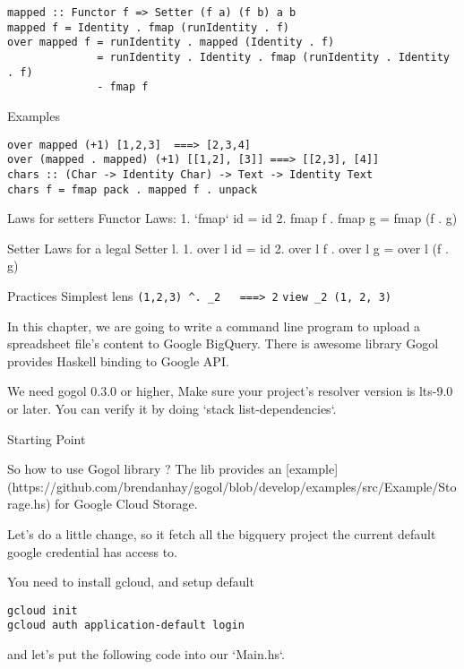 \begin{verbatim}
mapped :: Functor f => Setter (f a) (f b) a b
mapped f = Identity . fmap (runIdentity . f)
over mapped f = runIdentity . mapped (Identity . f)
              = runIdentity . Identity . fmap (runIdentity . Identity . f)
              - fmap f
\end{verbatim}

Examples

\begin{verbatim}
over mapped (+1) [1,2,3]  ===> [2,3,4]
over (mapped . mapped) (+1) [[1,2], [3]] ===> [[2,3], [4]]
chars :: (Char -> Identity Char) -> Text -> Identity Text
chars f = fmap pack . mapped f . unpack
\end{verbatim}

Laws for setters
Functor Laws:
1. `fmap` id = id
2. fmap f . fmap g = fmap (f . g)

Setter Laws for a legal Setter l.
1. over l id = id
2. over l f . over l g = over l (f . g)


Practices
Simplest lens
\verb|(1,2,3) ^. _2   ===> 2|
\verb|view _2 (1, 2, 3)|



In this chapter, we are going to write a command line program to upload a spreadsheet file's content to Google BigQuery. There is awesome library Gogol provides Haskell binding to Google API.



We need gogol 0.3.0 or higher, Make sure your project's resolver version is lts-9.0 or later. You can verify it by doing `stack list-dependencies`.

Starting Point

So how to use Gogol library ? The lib provides an [example](https://github.com/brendanhay/gogol/blob/develop/examples/src/Example/Storage.hs) for Google Cloud Storage.

Let's do a little change, so it fetch all the bigquery project the current default google credential has access to.

You need to install gcloud, and setup default
\begin{verbatim}
gcloud init
gcloud auth application-default login
\end{verbatim}

and let's put the following code into our `Main.hs`.

